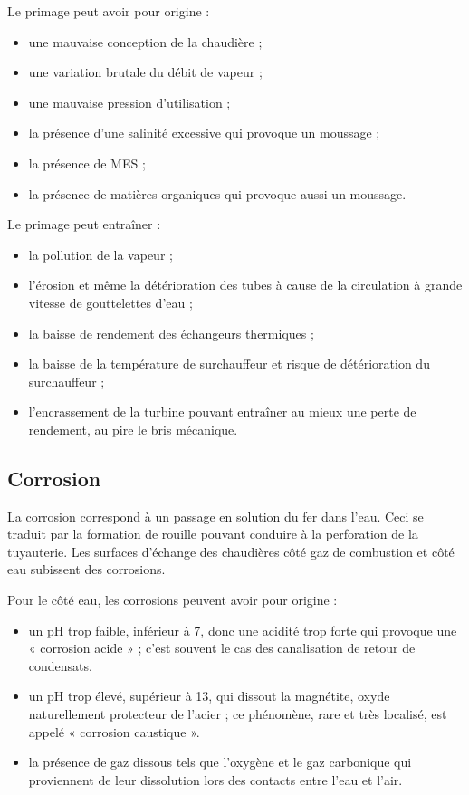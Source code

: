 Le primage peut avoir pour origine :


 \begin{itemize}
\item  une mauvaise conception de la chaudière ;
\item  une variation brutale du débit de vapeur ;
\item  une mauvaise pression d’utilisation ;
\item  la présence d’une salinité excessive qui provoque un moussage ;
\item  la présence de MES ;
\item  la présence de matières organiques qui provoque aussi un moussage.


\end{itemize}


Le primage peut entraîner :


\begin{itemize}
\item  la pollution de la vapeur ;
\item  l’érosion et même la détérioration des tubes à cause de la circulation à grande vitesse de gouttelettes d’eau ;
\item  la baisse de rendement des échangeurs thermiques ;
\item  la baisse de la température de surchauffeur et risque de détérioration du surchauffeur ;
\item  l’encrassement de la turbine pouvant entraîner au mieux une perte de rendement, au pire le bris mécanique.


\end{itemize}

\subsection{	Corrosion} 

La corrosion correspond à un passage en solution du fer dans l’eau. Ceci se traduit par la formation de rouille pouvant conduire à la perforation de la tuyauterie.
Les surfaces d’échange des chaudières côté gaz de combustion et côté eau subissent des corrosions.
\vspace{0.3cm}

Pour le côté eau, les corrosions peuvent avoir pour origine :


\begin{itemize}
\item  un pH trop faible, inférieur à 7, donc une acidité trop forte qui provoque une « corrosion acide » ; c’est souvent le cas des canalisation de retour de condensats.
\item  un pH trop élevé, supérieur à 13, qui dissout la magnétite, oxyde naturellement protecteur de l’acier ; ce phénomène, rare et très localisé, est appelé « corrosion caustique ».
\item  la présence de gaz dissous tels que l’oxygène et le gaz carbonique qui proviennent de leur dissolution lors des contacts entre l’eau et l’air.

\end{itemize}


